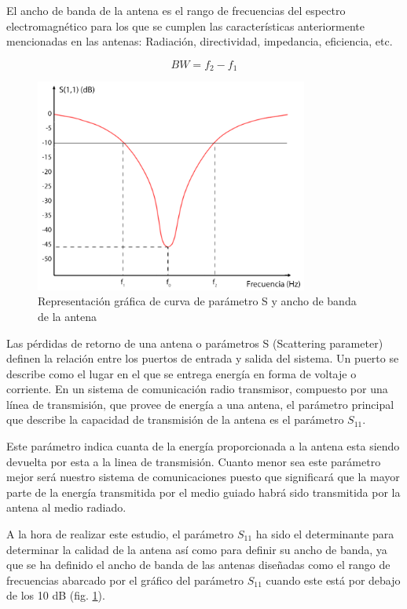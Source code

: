 \par El ancho de banda de la antena es el rango de frecuencias del espectro electromagnético para los que se cumplen las características anteriormente mencionadas en las antenas: Radiación, directividad, impedancia, eficiencia, etc. 

\begin{equation}
	BW=f_{2}-f_{1}
	\label{eq:anchodebanda}
\end{equation}
\begin{figure}[h]
    \centering
        \includegraphics[width=0.8\textwidth]{archivos/S}
        \caption{Representación gráfica de curva de parámetro S y ancho de banda de la antena}
        \label{fig:S}
\end{figure}
\par Las pérdidas de retorno de una antena o parámetros S (Scattering parameter) definen la relación entre los puertos de entrada y salida del sistema. Un puerto se describe como el lugar en el que se entrega energía en forma de voltaje o corriente. En un sistema de comunicación radio transmisor, compuesto por una línea de transmisión, que provee de energía a una antena, el parámetro principal que describe la capacidad de transmisión de la antena es el parámetro $S_{11}$. 
\\
\par Este parámetro indica cuanta de la energía proporcionada a la antena esta siendo devuelta por esta a la linea de transmisión. Cuanto menor sea este parámetro mejor será nuestro sistema de comunicaciones puesto que significará que la mayor parte de la energía transmitida por el medio guiado habrá sido transmitida por la antena al medio radiado. 
\\
\par A la hora de realizar este estudio, el parámetro $S_{11}$ ha sido el determinante para determinar la calidad de la antena así como para definir su ancho de banda, ya que se ha definido el ancho de banda de las antenas diseñadas como el rango de frecuencias abarcado por el gráfico del parámetro $S_{11}$ cuando este está por debajo de los 10 dB (fig. \ref{fig:S}).
\\


